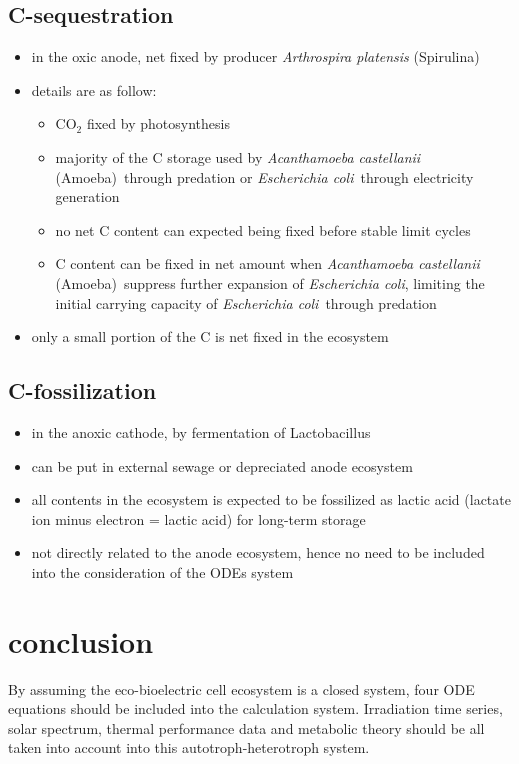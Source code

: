 \documentclass[a4paper,11pt]{article}
\newcommand{\ec}{\textit{Escherichia coli}}
\newcommand{\am}{\textit{Acanthamoeba castellanii} (Amoeba)}
\newcommand{\ap}{\textit{Arthrospira platensis} (Spirulina)}
\begin{document}
    \subsection{C-sequestration}
    \begin{itemize}
        \item in the oxic anode, net fixed by producer \ap
        \item details are as follow:
        \begin{itemize}
            \item CO$_2$ fixed by photosynthesis
            \item majority of the C storage used by \am\ through predation or \ec\ through electricity generation
            \item no net C content can expected being fixed before stable limit cycles
            \item C content can be fixed in net amount when \am\ suppress further expansion of \ec, limiting the initial carrying capacity of \ec\ through predation
        \end{itemize}
        \item only a small portion of the C is net fixed in the ecosystem
    \end{itemize}

    \subsection{C-fossilization}
    \begin{itemize}
        \item in the anoxic cathode, by fermentation of Lactobacillus
        \item can be put in external sewage or depreciated anode ecosystem
        \item all contents in the ecosystem is expected to be fossilized as lactic acid (lactate ion minus electron = lactic acid) for long-term storage
        \item not directly related to the anode ecosystem, hence no need to be included into the consideration of the ODEs system
    \end{itemize}
    
    \section{conclusion}
    By assuming the eco-bioelectric cell ecosystem is a closed system, four ODE equations should be included into the calculation system.  Irradiation time series, solar spectrum, thermal performance data and metabolic theory should be all taken into account into this autotroph-heterotroph system.

    \nocite{*}\printbibliography
\end{document}
